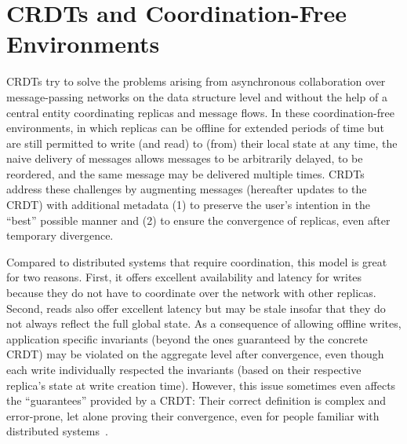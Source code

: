 

\section{\acsp{CRDT} and Coordination-Free Environments}\label{sec:crdt-coordination-free}

\acfp{CRDT}\footnotemark{} try to solve the problems arising from asynchronous
collaboration over message-passing networks on the data structure level and
without the help of a central entity coordinating replicas and message flows.
In these coordination-free environments, in which replicas can be offline
for extended periods of time but are still permitted to write (and read)
to (from) their local state at any time,
the naive delivery of messages allows messages to be arbitrarily delayed,
to be reordered, and the same message may be delivered multiple times.
\acp{CRDT} address these challenges by augmenting messages (hereafter updates
to the \ac{CRDT}) with additional metadata (1) to preserve the user's intention
in the ``best'' possible manner and (2) to ensure the convergence of replicas,
even after temporary divergence.


Compared to distributed systems that require coordination,
this model is great for two reasons.
First, it offers excellent availability and latency for writes because
they do not have to coordinate over the network with other replicas.
Second, reads also offer excellent latency but may be stale insofar that they
do not always reflect the full global state.
As a consequence of allowing offline writes,
application specific invariants (beyond the ones guaranteed by the concrete \ac{CRDT})
may be violated on the aggregate level after convergence,
even though each write individually respected the invariants (based on their
respective replica's state at write creation time).
However, this issue sometimes even affects the ``guarantees'' provided by a \ac{CRDT}:
Their correct definition is complex and error-prone,
let alone proving their convergence, even for people familiar with distributed
systems~\cite{kleppmann2022assessing, gomes2017verifying}.

